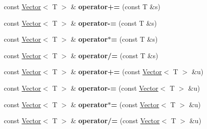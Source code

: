 \begin{DoxyCompactItemize}
\item 
\mbox{\label{classTLAS_1_1Vector_a4ef8ac6ab6aac02280ad030b35d9c606}} 
const \hyperlink{classTLAS_1_1Vector}{Vector}$<$ T $>$ \& {\bfseries operator+=} (const T \&s)
\item 
\mbox{\label{classTLAS_1_1Vector_aafd582262b51fd9496ebc8d35b20c6db}} 
const \hyperlink{classTLAS_1_1Vector}{Vector}$<$ T $>$ \& {\bfseries operator-\/=} (const T \&s)
\item 
\mbox{\label{classTLAS_1_1Vector_ae21cb3cc6e9993752de27f5366c380d7}} 
const \hyperlink{classTLAS_1_1Vector}{Vector}$<$ T $>$ \& {\bfseries operator$\ast$=} (const T \&s)
\item 
\mbox{\label{classTLAS_1_1Vector_a747f2e7048cbc9ab8b6adeed350f78f0}} 
const \hyperlink{classTLAS_1_1Vector}{Vector}$<$ T $>$ \& {\bfseries operator/=} (const T \&s)
\item 
\mbox{\label{classTLAS_1_1Vector_ae161dedb88ccfb63590c40efe2092bb4}} 
const \hyperlink{classTLAS_1_1Vector}{Vector}$<$ T $>$ \& {\bfseries operator+=} (const \hyperlink{classTLAS_1_1Vector}{Vector}$<$ T $>$ \&u)
\item 
\mbox{\label{classTLAS_1_1Vector_a845414863cb3f427afb44967c61a9f45}} 
const \hyperlink{classTLAS_1_1Vector}{Vector}$<$ T $>$ \& {\bfseries operator-\/=} (const \hyperlink{classTLAS_1_1Vector}{Vector}$<$ T $>$ \&u)
\item 
\mbox{\label{classTLAS_1_1Vector_a76169429a540fa196fd8318daa57ac36}} 
const \hyperlink{classTLAS_1_1Vector}{Vector}$<$ T $>$ \& {\bfseries operator$\ast$=} (const \hyperlink{classTLAS_1_1Vector}{Vector}$<$ T $>$ \&u)
\item 
\mbox{\label{classTLAS_1_1Vector_a810fa0897c966423471c0bba943bee06}} 
const \hyperlink{classTLAS_1_1Vector}{Vector}$<$ T $>$ \& {\bfseries operator/=} (const \hyperlink{classTLAS_1_1Vector}{Vector}$<$ T $>$ \&u)
\item 
\mbox{\label{classTLAS_1_1Vector_a5332f13d47133c510d982ea8606fd758}} 

\end{DoxyCompactItemize}
